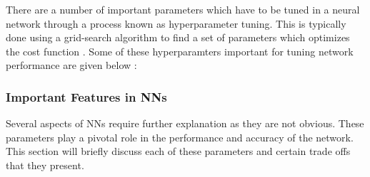 There are a number of important parameters which have to be tuned in a neural
network through a process known as hyperparameter tuning. This is typically done
using a grid-search algorithm to find a set of parameters which optimizes the
cost function \cite{LiDL2019}. Some of these hyperparamters important for tuning
network performance are given below :

\subsubsection{Important Features in \ac{NN}s}
Several aspects of \ac{NN}s require further explanation as they are not obvious.
These parameters play a pivotal role in the performance and accuracy of the
network. This section will briefly discuss each of these parameters and certain
trade offs that they present.

